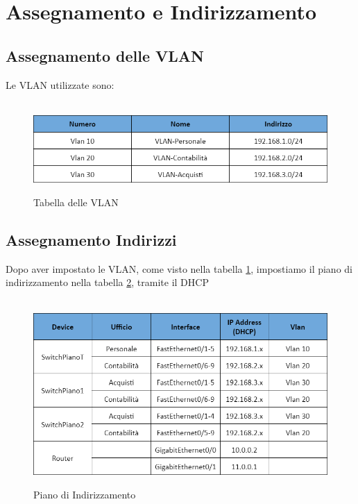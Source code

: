 \documentclass[12pt]{article}
\begin{document}
    \newpage
    \section{Assegnamento e Indirizzamento}

    \subsection{Assegnamento delle VLAN}
    Le VLAN utilizzate sono:
        \begin{figure}[h!]
            \begin{center}
                \label{tab:TabellaVLAN}
                \caption{Tabella delle VLAN}
                ~ \\
                \includegraphics[width = 15cm]{Assets/TabellaDelleVlan.png}    
            \end{center}
        \end{figure}

    \subsection{Assegnamento Indirizzi}
    \noindent Dopo aver impostato le VLAN, come visto nella tabella \ref*{tab:TabellaVLAN}, impostiamo il piano di indirizzamento nella tabella \ref*{tab:indirizzamento}, 
        tramite il DHCP
        \begin{figure}[h!]
            \begin{center}
                \label{tab:indirizzamento}
                \caption{Piano di Indirizzamento}
                ~ \\ 
                \includegraphics[width = 15cm]{Assets/TabellaDegliIndirizzi.png}
            \end{center}
        \end{figure}
\end{document}
